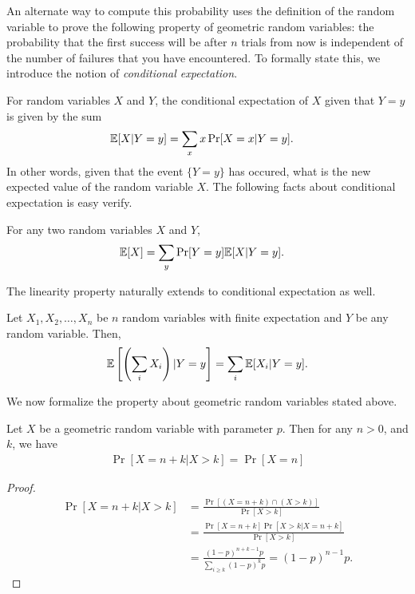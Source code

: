 An alternate way to compute this probability uses the definition of the random variable to prove the following property of geometric random variables: the probability that the first success will be after $n$ trials from now is independent of the number of failures that you have encountered. To formally state this, we introduce the notion of \emph{conditional expectation}.

For random variables $X$ and $Y$, the conditional expectation of $X$ given that $Y=y$ is given by the sum
\begin{align*}
	\mathbb{E}[X|Y=y] &= \sum_{x} x \Pr[X=x|Y=y].
\end{align*}
In other words, given that the event $\{Y=y\}$ has occured, what is the new expected value of the random variable $X$. The following facts about conditional expectation is easy verify.
\begin{fact}
	For any two random variables $X$ and $Y$, 
	\begin{align*}
		\mathbb{E}[X] &= \sum_{y} \Pr[Y=y] \mathbb{E}[X|Y=y].
	\end{align*}
\end{fact}

The linearity property naturally extends to conditional expectation as well.
\begin{fact}
	Let $X_1, X_2, \ldots, X_n$ be $n$ random variables with finite expectation  and $Y$ be any random variable. Then,
	\begin{align*}
		\mathbb{E}\left[ \left(\sum_i X_i\right) | Y=y \right] = \sum_i \mathbb{E}[X_i | Y=y]. 
	\end{align*}
\end{fact}

We now formalize the property about geometric random variables stated above.
\begin{theorem}
	Let $X$ be a geometric random variable with parameter $p$. Then for any $n>0$, and $k$, we have
	\begin{align*}
		\Pr[X = n+k | X > k] = \Pr[X=n]
	\end{align*}
	\label{thm:geom-mem}
\end{theorem}
\begin{proof}
	\begin{align*}
		\Pr[X = n+k | X > k] &= \frac{\Pr[(X=n+k) \cap (X>k)]}{\Pr[X>k]}\\
		&= \frac{\Pr[X=n+k]\Pr[X>k | X=n+k]}{\Pr[X>k]}\\
		&= \frac{(1-p)^{n+k-1}p}{\sum_{i\geq k}(1-p)^kp} = (1-p)^{n-1}p.
	\end{align*}
\end{proof}

